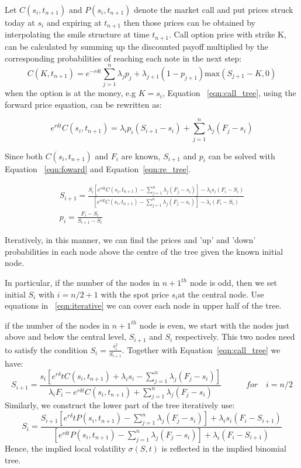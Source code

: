 Let $C(s_i, t_{n+1})$ and $P(s_i, t_{n+1})$ denote the market call and put prices struck today at $s_i$ and expiring at $t_{n+1}$ then those prices can be obtained by interpolating the smile structure at time $t_{n+1}$. Call option price with strike K, can be calculated by summing up the discounted payoff multiplied by the corresponding probabilities of reaching each note in the next step:
\begin{equation}
\label{eqn:call_tree}
C(K, t_{n+1}) = e^{-r \delta t} \sum_{j=1}^n {\lambda_j p_j +\lambda_{j+1}(1- p_{j+1})} \text{max} (S_{j+1}-K, 0)
\end{equation}
when the option is at the money, e.g $K= s_i$, Equation ~\ref{eqn:call_tree}, using the forward price equation, can be rewritten as:

\begin{equation}
\label{eqn:re_tree}
e^{r \delta t}C(s_i, t_{n+1}) =   \lambda_i p_i (S_{i+1}-s_i)+\sum_{j=1}^n \lambda_{j}(F_j- s_i)
\end{equation}

Since both $C(s_i, t_{n+1})$ and $F_i$ are known, $S_{i+1}$ and $p_i$ can be solved with Equation 
~\ref{eqn:foward} and Equation~\ref{eqn:re_tree}.

\begin{align}
\label{eqn:iterative}
S_{i+1} = \frac{S_i[e^{r\delta t}C(s_i, t_{n+1})-\sum_{j=1}^n \lambda_{j}(F_j- s_i)]-\lambda_i s_i(F_i-S_i) }{[e^{r\delta t} C(s_i, t_{n+1})-\sum_{j=1}^n \lambda_{j}(F_j- s_i)]-\lambda_i (F_i-S_i)}\\
p_i = \frac{F_i -S_i}{S_{i+1}-S_i}
\end{align}

Iteratively, in this manner, we can find the prices and 'up' and 'down' probabilities in each node above the centre of the tree given the known initial node.

In particular, if the number of the nodes in $n+1^{th}$ node is odd, then we set initial $S_i$ with $i=n/2 +1$ with the spot price $s_i$at the central node. Use equations in ~\ref{eqn:iterative} we can cover each node in upper half of the tree.  

if the number of the nodes in $n+1^{th}$ node is even, we start with the nodes just above and below the central level, $S_{i+1}$ and $S_i$ respectively. This two nodes need to satisfy the condition $S_i = \frac{s_i^2}{S_{i+1}}$. Together with Equation~\ref{eqn:call_tree} we have:
\begin{equation}
S_{i+1} = \frac{s_i[e^{r\delta} t C(s_i, t_{n+1})+\lambda_i s_i -\sum_{j=1}^n \lambda_{j}(F_j- s_i)]}{\lambda_i F_i - e^{r\delta t} C(s_i, t_{n+1})+\sum_{j=1}^n \lambda_{j}(F_j- s_i)} \quad\quad\quad for \quad i =n/2
\end{equation}
Similarly, we construct the lower part of the tree iteratively use:
\begin{equation}
S_{i} = \frac{S_{i+1}[e^{r\delta} t P(s_i, t_{n+1})-\sum_{j=1}^n \lambda_{j}(F_j- s_i)]+\lambda_i s_i(F_i-S_{i+1})}{[e^{r\delta t} P(s_i, t_{n+1})-\sum_{j=1}^n \lambda_{j}(F_j- s_i)]+\lambda_i (F_i-S_{i+1})} 
\end{equation}
Hence, the implied local volatility $\sigma(S,t)$ is reflected in the implied binomial tree.




